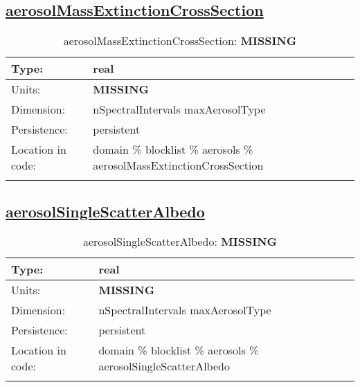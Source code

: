 \subsection[aerosolMassExtinctionCrossSection]{\hyperref[sec:var_tab_aerosols]{aerosolMassExtinctionCrossSection}}
\label{subsec:var_sec_aerosols_aerosolMassExtinctionCrossSection}
\begin{center}
\begin{longtable}{| p{2.0in} | p{4.0in} |}
        \hline 
        Type: & real \\
        \hline 
        Units: & {\bf \color{red} MISSING} \\
        \hline 
        Dimension: & nSpectralIntervals maxAerosolType \\
        \hline 
        Persistence: & persistent \\
        \hline 
         Location in code: & domain \% blocklist \% aerosols \% aerosolMassExtinctionCrossSection \\
         \hline 
    \caption{aerosolMassExtinctionCrossSection: {\bf \color{red} MISSING}}
\end{longtable}
\end{center}
\subsection[aerosolSingleScatterAlbedo]{\hyperref[sec:var_tab_aerosols]{aerosolSingleScatterAlbedo}}
\label{subsec:var_sec_aerosols_aerosolSingleScatterAlbedo}
\begin{center}
\begin{longtable}{| p{2.0in} | p{4.0in} |}
        \hline 
        Type: & real \\
        \hline 
        Units: & {\bf \color{red} MISSING} \\
        \hline 
        Dimension: & nSpectralIntervals maxAerosolType \\
        \hline 
        Persistence: & persistent \\
        \hline 
         Location in code: & domain \% blocklist \% aerosols \% aerosolSingleScatterAlbedo \\
         \hline 
    \caption{aerosolSingleScatterAlbedo: {\bf \color{red} MISSING}}
\end{longtable}
\end{center}
